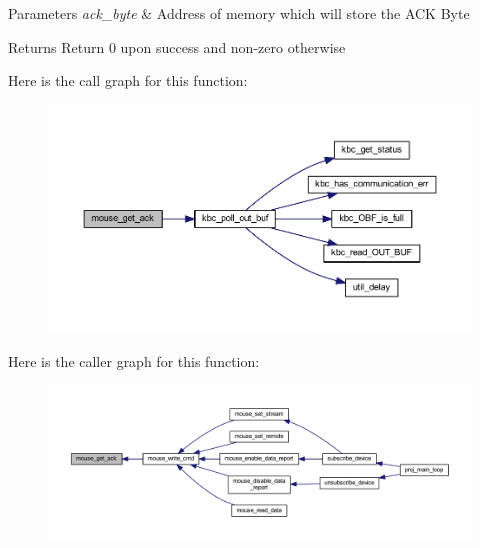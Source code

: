 \begin{DoxyParams}{Parameters}
{\em ack\+\_\+byte} & Address of memory which will store the A\+CK Byte \\
\hline
\end{DoxyParams}
\begin{DoxyReturn}{Returns}
Return 0 upon success and non-\/zero otherwise 
\end{DoxyReturn}
Here is the call graph for this function\+:\nopagebreak
\begin{figure}[H]
\begin{center}
\leavevmode
\includegraphics[width=350pt]{group__mouse_ga49c9125041daa483d30f55a8c28b41fc_cgraph}
\end{center}
\end{figure}
Here is the caller graph for this function\+:\nopagebreak
\begin{figure}[H]
\begin{center}
\leavevmode
\includegraphics[width=350pt]{group__mouse_ga49c9125041daa483d30f55a8c28b41fc_icgraph}
\end{center}
\end{figure}
\mbox{\label{group__mouse_ga3d0c72c442c9903f8ca9e71fe973883a}} 
